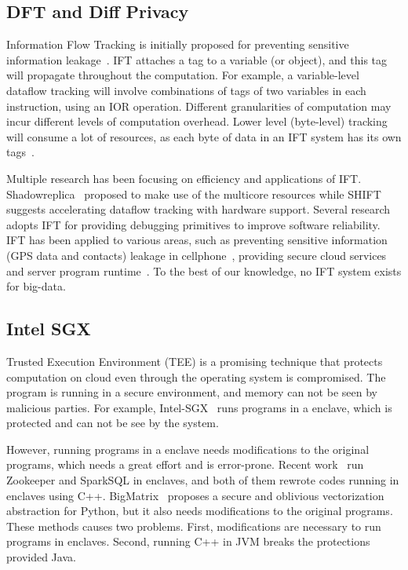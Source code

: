 \vspace{-.15in}\subsection{DFT and Diff Privacy}
\label{sec:dft}\vspace{-.075in}

Information Flow Tracking is initially proposed for preventing sensitive 
information
leakage~\cite{dawn05:taint}.
IFT attaches a tag to a variable (or object),
and this tag will propagate throughout the computation.
For example, a variable-level dataflow tracking will involve combinations of
tags of two variables in each instruction, using an IOR operation.
Different granularities of computation may incur different levels
of computation overhead. Lower level (\eg byte-level) tracking will consume
a lot of resources, as each byte of data in an IFT system has its own 
tags~\cite{libdft:vee12}.
 
Multiple research has been focusing on efficiency and applications of IFT.
Shadowreplica~\cite{shadowreplica:ccs13} proposed to make use of the multicore 
resources while SHIFT~\cite{hardwardtaint:isca08}
suggests accelerating dataflow tracking with hardware support.
Several research~\cite{mit07:coverage,fse12:dtam} adopts IFT for providing 
debugging primitives
to improve software reliability.
IFT has been applied to various areas, such as preventing sensitive information 
(\eg GPS data and contacts)
leakage in cellphone~\cite{taintdroid:osdi10, cleanos:osdi12}, providing secure
cloud services~\cite{cloudfence:raid13} and server program 
runtime~\cite{libdft:vee12}.
To the best of
our knowledge, no IFT system exists for big-data.

\vspace{-.15in}\subsection{Intel SGX}
\label{sec:sgx}\vspace{-.075in}

Trusted Execution Environment (TEE) is a promising technique that
protects computation on cloud even through the operating system is
compromised. The program is running in a secure environment, and memory can not
be seen by malicious parties. For example, Intel-SGX~\cite{intel-sgx} runs 
programs
in a enclave, which is protected and can not be see by the system.

However, running programs in a enclave needs modifications to the original
programs, which needs a great effort and is error-prone. Recent
work~\cite{securekeeper,opaque:nsdi17} run Zookeeper and SparkSQL in enclaves,
and both of them rewrote codes running in enclaves using C++.
BigMatrix~\cite{bigmatrix:ccs17} proposes a secure and oblivious vectorization
abstraction for Python, but it also needs modifications to the original 
programs.
These methods causes two problems. First, modifications are necessary to run
programs in enclaves. Second, running C++ in JVM breaks the protections
provided Java.

